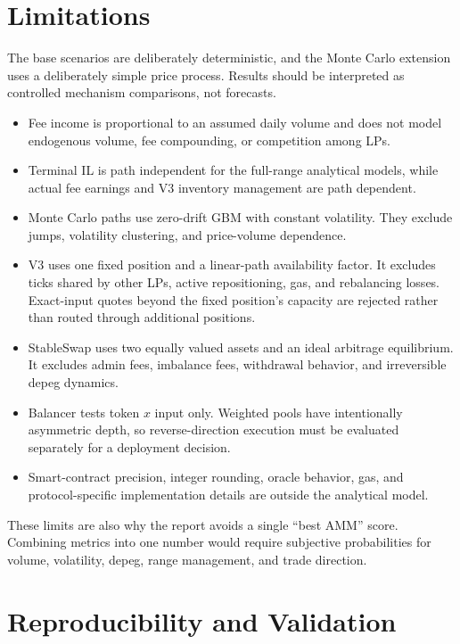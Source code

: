 \documentclass[11pt,twocolumn]{article}
\begin{document}
\section{Limitations}

The base scenarios are deliberately deterministic, and the Monte Carlo
extension uses a deliberately simple price process. Results should be
interpreted as controlled mechanism comparisons, not forecasts.

\begin{itemize}
  \item Fee income is proportional to an assumed daily volume and does not
  model endogenous volume, fee compounding, or competition among LPs.
  \item Terminal IL is path independent for the full-range analytical models,
  while actual fee earnings and V3 inventory management are path dependent.
  \item Monte Carlo paths use zero-drift GBM with constant volatility. They
  exclude jumps, volatility clustering, and price-volume dependence.
  \item V3 uses one fixed position and a linear-path availability factor. It
  excludes ticks shared by other LPs, active repositioning, gas, and
  rebalancing losses. Exact-input quotes beyond the fixed position's capacity
  are rejected rather than routed through additional positions.
  \item StableSwap uses two equally valued assets and an ideal arbitrage
  equilibrium. It excludes admin fees, imbalance fees, withdrawal behavior,
  and irreversible depeg dynamics.
  \item Balancer tests token $x$ input only. Weighted pools have intentionally
  asymmetric depth, so reverse-direction execution must be evaluated
  separately for a deployment decision.
  \item Smart-contract precision, integer rounding, oracle behavior, gas, and
  protocol-specific implementation details are outside the analytical model.
\end{itemize}

These limits are also why the report avoids a single ``best AMM'' score.
Combining metrics into one number would require subjective probabilities for
volume, volatility, depeg, range management, and trade direction.

\section{Reproducibility and Validation}
\end{document}
